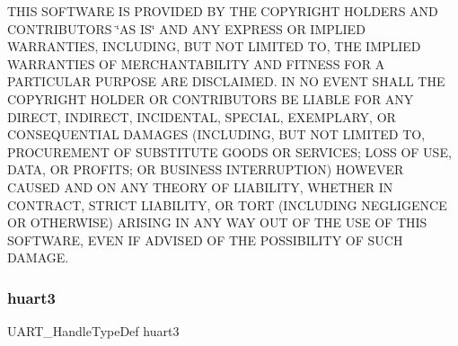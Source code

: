 T\+H\+IS S\+O\+F\+T\+W\+A\+RE IS P\+R\+O\+V\+I\+D\+ED BY T\+HE C\+O\+P\+Y\+R\+I\+G\+HT H\+O\+L\+D\+E\+RS A\+ND C\+O\+N\+T\+R\+I\+B\+U\+T\+O\+RS \char`\"{}\+A\+S I\+S\char`\"{} A\+ND A\+NY E\+X\+P\+R\+E\+SS OR I\+M\+P\+L\+I\+ED W\+A\+R\+R\+A\+N\+T\+I\+ES, I\+N\+C\+L\+U\+D\+I\+NG, B\+UT N\+OT L\+I\+M\+I\+T\+ED TO, T\+HE I\+M\+P\+L\+I\+ED W\+A\+R\+R\+A\+N\+T\+I\+ES OF M\+E\+R\+C\+H\+A\+N\+T\+A\+B\+I\+L\+I\+TY A\+ND F\+I\+T\+N\+E\+SS F\+OR A P\+A\+R\+T\+I\+C\+U\+L\+AR P\+U\+R\+P\+O\+SE A\+RE D\+I\+S\+C\+L\+A\+I\+M\+ED. IN NO E\+V\+E\+NT S\+H\+A\+LL T\+HE C\+O\+P\+Y\+R\+I\+G\+HT H\+O\+L\+D\+ER OR C\+O\+N\+T\+R\+I\+B\+U\+T\+O\+RS BE L\+I\+A\+B\+LE F\+OR A\+NY D\+I\+R\+E\+CT, I\+N\+D\+I\+R\+E\+CT, I\+N\+C\+I\+D\+E\+N\+T\+AL, S\+P\+E\+C\+I\+AL, E\+X\+E\+M\+P\+L\+A\+RY, OR C\+O\+N\+S\+E\+Q\+U\+E\+N\+T\+I\+AL D\+A\+M\+A\+G\+ES (I\+N\+C\+L\+U\+D\+I\+NG, B\+UT N\+OT L\+I\+M\+I\+T\+ED TO, P\+R\+O\+C\+U\+R\+E\+M\+E\+NT OF S\+U\+B\+S\+T\+I\+T\+U\+TE G\+O\+O\+DS OR S\+E\+R\+V\+I\+C\+ES; L\+O\+SS OF U\+SE, D\+A\+TA, OR P\+R\+O\+F\+I\+TS; OR B\+U\+S\+I\+N\+E\+SS I\+N\+T\+E\+R\+R\+U\+P\+T\+I\+ON) H\+O\+W\+E\+V\+ER C\+A\+U\+S\+ED A\+ND ON A\+NY T\+H\+E\+O\+RY OF L\+I\+A\+B\+I\+L\+I\+TY, W\+H\+E\+T\+H\+ER IN C\+O\+N\+T\+R\+A\+CT, S\+T\+R\+I\+CT L\+I\+A\+B\+I\+L\+I\+TY, OR T\+O\+RT (I\+N\+C\+L\+U\+D\+I\+NG N\+E\+G\+L\+I\+G\+E\+N\+CE OR O\+T\+H\+E\+R\+W\+I\+SE) A\+R\+I\+S\+I\+NG IN A\+NY W\+AY O\+UT OF T\+HE U\+SE OF T\+H\+IS S\+O\+F\+T\+W\+A\+RE, E\+V\+EN IF A\+D\+V\+I\+S\+ED OF T\+HE P\+O\+S\+S\+I\+B\+I\+L\+I\+TY OF S\+U\+CH D\+A\+M\+A\+GE. \mbox{\label{usart_8c_ab7c63c1b0f65db92b6a4ea19edf957e1}} 
\subsubsection{huart3}
{\footnotesize\ttfamily U\+A\+R\+T\+\_\+\+Handle\+Type\+Def huart3}

